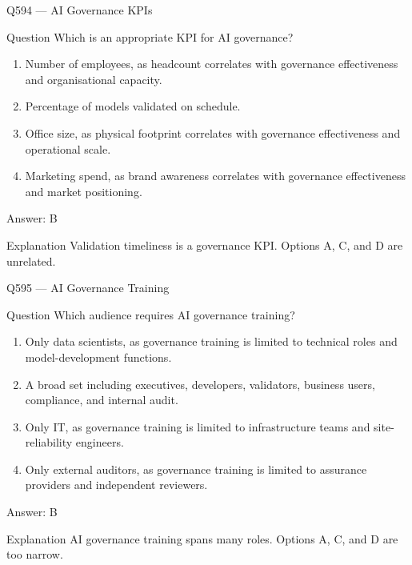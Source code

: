 \documentclass[aspectratio=169,8pt]{beamer}
\begin{document}
	\begin{frame}{Q594 --- AI Governance KPIs}
		\begin{block}{Question}
			Which is an appropriate KPI for AI governance?
			\begin{enumerate}
				\item Number of employees, as headcount correlates with governance effectiveness and organisational capacity.
				\item Percentage of models validated on schedule.
				\item Office size, as physical footprint correlates with governance effectiveness and operational scale.
				\item Marketing spend, as brand awareness correlates with governance effectiveness and market positioning.
			\end{enumerate}
		\end{block}
		\begin{exampleblock}{Answer: B}\end{exampleblock}
		\begin{block}{Explanation}
			Validation timeliness is a governance KPI. Options A, C, and D are unrelated.
		\end{block}
	\end{frame}
	
	\begin{frame}{Q595 --- AI Governance Training}
		\begin{block}{Question}
			Which audience requires AI governance training?
			\begin{enumerate}
				\item Only data scientists, as governance training is limited to technical roles and model-development functions.
				\item A broad set including executives, developers, validators, business users, compliance, and internal audit.
				\item Only IT, as governance training is limited to infrastructure teams and site-reliability engineers.
				\item Only external auditors, as governance training is limited to assurance providers and independent reviewers.
			\end{enumerate}
		\end{block}
		\begin{exampleblock}{Answer: B}\end{exampleblock}
		\begin{block}{Explanation}
			AI governance training spans many roles. Options A, C, and D are too narrow.
		\end{block}
	\end{frame}
	
\end{document}
